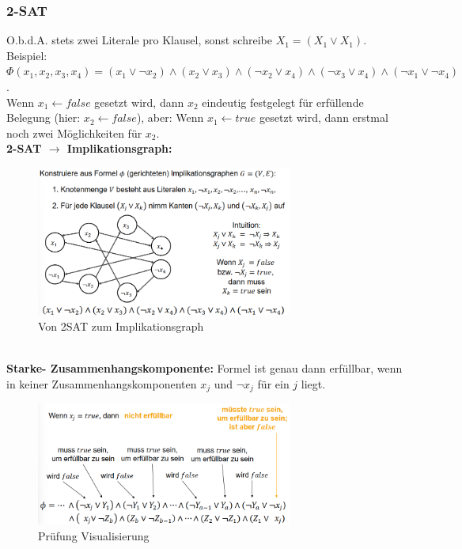 \documentclass{article}
\begin{document}
            \subsubsection{2-SAT}
                O.b.d.A. stets zwei Literale pro Klausel, sonst schreibe $X_1=(X_1 \vee X_1).$\\
                Beispiel: $\Phi(x_1,x_2,x_3,x_4)=(x_1 \vee \lnot x_2)\wedge(x_2 \vee x_3)\wedge(\lnot x_2 \vee x_4)\wedge(\lnot x_3 \vee x_4)\wedge(\lnot x_1 \vee \lnot x_4)$.\\
                Wenn $x_1 \leftarrow false$ gesetzt wird, dann $x_2$ eindeutig festgelegt für erfüllende Belegung (hier: $x_2 \leftarrow false$), aber: Wenn $x_1 \leftarrow true$ gesetzt wird, dann erstmal noch zwei Möglichkeiten für $x_2$.\\
                \textbf{2-SAT $\rightarrow$ Implikationsgraph:}
                \begin{figure}[ht]
                    \centering
                    \includegraphics[width=0.75\textwidth]{Bilder/2SIG.png}
                    \caption{Von 2SAT zum Implikationsgraph}
                    \label{fig:2SIG}
                \end{figure}\\
                \textbf{Starke- Zusammenhangskomponente:} Formel ist genau dann erfüllbar, wenn in keiner Zusammenhangskomponenten $x_j$ und $\lnot x_j$ für ein $j$ liegt.\\
                \begin{figure}[ht]
                    \centering
                    \includegraphics[width=0.75\textwidth]{Bilder/ErfPr.png}
                    \caption{Prüfung Visualisierung}
                    \label{fig:ErfPr}
                \end{figure}\\
\end{document}
